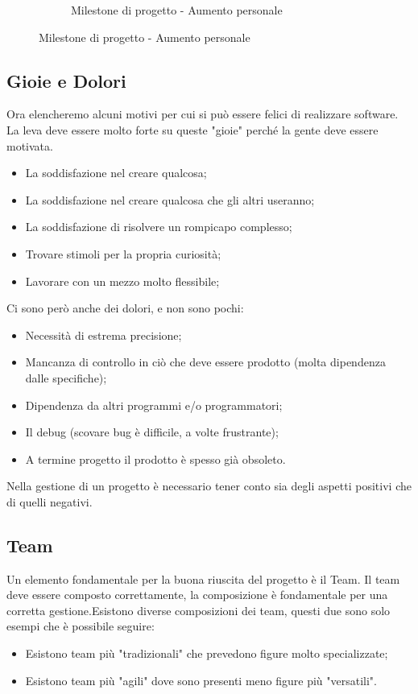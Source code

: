 \begin{figure}[H]
\begin{subfigure}{.32 \textwidth}
		\caption{Milestone di progetto - Aumento personale}
	\end{subfigure}%
\end{figure}
\subsection{Gioie e Dolori}
Ora elencheremo alcuni motivi per cui si può essere felici di realizzare software. La leva deve essere molto forte su queste "gioie" perché la gente deve essere motivata.
\begin{itemize}
	\item La soddisfazione nel creare qualcosa;
	\item La soddisfazione nel creare qualcosa che gli altri useranno;
	\item La soddisfazione di risolvere un rompicapo complesso;
	\item Trovare stimoli per la propria curiosità;
	\item Lavorare con un mezzo molto flessibile;
\end{itemize}
Ci sono però anche dei dolori, e non sono pochi:
\begin{itemize}
	\item Necessità di estrema precisione;
	\item Mancanza di controllo in ciò che deve essere prodotto (molta dipendenza dalle specifiche);
	\item Dipendenza da altri programmi e/o programmatori;
	\item Il debug (scovare bug è difficile, a volte frustrante);
	\item A termine progetto il prodotto è spesso già obsoleto.
\end{itemize}
Nella gestione di un progetto è necessario tener conto sia degli aspetti positivi che di quelli negativi.
\subsection{Team}
Un elemento fondamentale per la buona riuscita del progetto è il Team. Il team deve essere composto correttamente, la composizione è fondamentale per una corretta gestione.Esistono diverse composizioni dei team, questi due sono solo esempi che è possibile seguire:
\begin{itemize}
	\item Esistono team più "tradizionali" che prevedono figure molto specializzate;
	\item Esistono team più "agili" dove sono presenti meno figure più "versatili".
\end{itemize}
